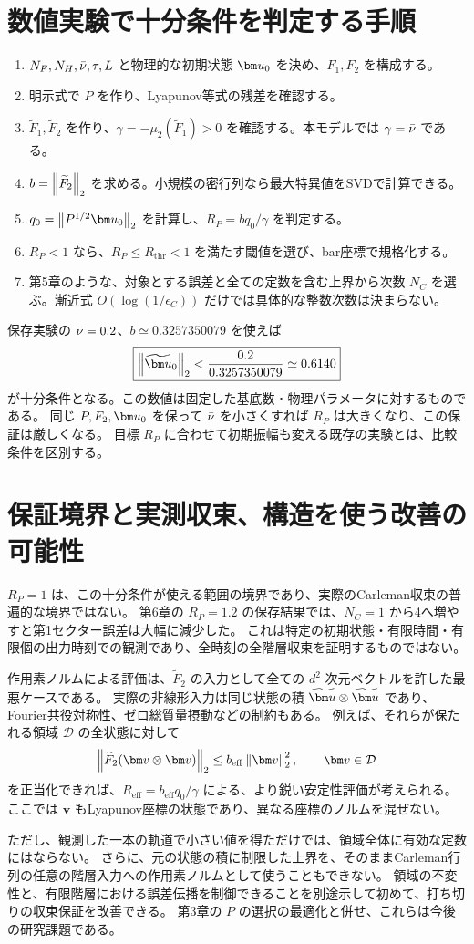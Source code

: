 \section{数値実験で十分条件を判定する手順}
\begin{enumerate}
\item $N_F,N_H,\bar\nu,\tau,L$ と物理的な初期状態 $\uu_0$ を決め、$F_1,F_2$ を構成する。
\item 明示式で $P$ を作り、Lyapunov等式の残差を確認する。
\item $\widetilde F_1,\widetilde F_2$ を作り、$\gamma=-\mu_2(\widetilde F_1)>0$ を確認する。本モデルでは $\gamma=\bar\nu$ である。
\item $b=\left\lVert \widetilde F_2\right\rVert_2$ を求める。小規模の密行列なら最大特異値をSVDで計算できる。
\item $q_0=\normtwo{P^{1/2}\uu_0}$ を計算し、$R_P=bq_0/\gamma$ を判定する。
\item $R_P<1$ なら、$R_P\leq R_{\mathrm{thr}}<1$ を満たす閾値を選び、bar座標で規格化する。
\item 第5章のような、対象とする誤差と全ての定数を含む上界から次数 $N_C$ を選ぶ。漸近式 $O(\log(1/\epsilon_C))$ だけでは具体的な整数次数は決まらない。
\end{enumerate}

保存実験の $\bar\nu=0.2$、$b\simeq0.3257350079$ を使えば
\[
\boxed{\normtwo{\tu_0}<\frac{0.2}{0.3257350079}\simeq0.6140}
\]
が十分条件となる。この数値は固定した基底数・物理パラメータに対するものである。
同じ $P,F_2,\uu_0$ を保って $\bar\nu$ を小さくすれば $R_P$ は大きくなり、この保証は厳しくなる。
目標 $R_P$ に合わせて初期振幅も変える既存の実験とは、比較条件を区別する。

\section{保証境界と実測収束、構造を使う改善の可能性}
$R_P=1$ は、この十分条件が使える範囲の境界であり、実際のCarleman収束の普遍的な境界ではない。
第6章の $R_P=1.2$ の保存結果では、$N_C=1$ から4へ増やすと第1セクター誤差は大幅に減少した。
これは特定の初期状態・有限時間・有限個の出力時刻での観測であり、全時刻の全階層収束を証明するものではない。

作用素ノルムによる評価は、$\widetilde F_2$ の入力として全ての $d^2$ 次元ベクトルを許した最悪ケースである。
実際の非線形入力は同じ状態の積 $\tu\otimes\tu$ であり、Fourier共役対称性、ゼロ総質量摂動などの制約もある。
例えば、それらが保たれる領域 $\mathcal D$ の全状態に対して
\[
\normtwo{\widetilde F_2(\bm v\otimes\bm v)}
\leq b_{\mathrm{eff}}\normtwo{\bm v}^2,
\qquad \bm v\in\mathcal D
\]
を正当化できれば、$R_{\mathrm{eff}}=b_{\mathrm{eff}}q_0/\gamma$ による、より鋭い安定性評価が考えられる。
ここでは $\bm v$ もLyapunov座標の状態であり、異なる座標のノルムを混ぜない。

ただし、観測した一本の軌道で小さい値を得ただけでは、領域全体に有効な定数にはならない。
さらに、元の状態の積に制限した上界を、そのままCarleman行列の任意の階層入力への作用素ノルムとして使うこともできない。
領域の不変性と、有限階層における誤差伝播を制御できることを別途示して初めて、打ち切りの収束保証を改善できる。
第3章の $P$ の選択の最適化と併せ、これらは今後の研究課題である。
